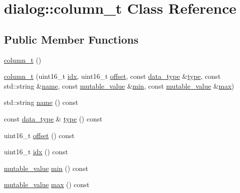 \hypertarget{classdialog_1_1column__t}{}\section{dialog\+:\+:column\+\_\+t Class Reference}
\label{classdialog_1_1column__t}
\subsection*{Public Member Functions}
\begin{DoxyCompactItemize}
\item 
\hyperlink{classdialog_1_1column__t_a294bc42fee87fb4e55542bda71a98843}{column\+\_\+t} ()
\item 
\hyperlink{classdialog_1_1column__t_a90d375f7d115c8241453867ebaf36b89}{column\+\_\+t} (uint16\+\_\+t \hyperlink{classdialog_1_1column__t_aca785728bbaaced685cd2e0d6a027173}{idx}, uint16\+\_\+t \hyperlink{classdialog_1_1column__t_a3889fc0e609ebba20c9b323a194cade1}{offset}, const \hyperlink{structdialog_1_1data__type}{data\+\_\+type} \&\hyperlink{classdialog_1_1column__t_a8316411224f15b6f25c59471422ca167}{type}, const std\+::string \&\hyperlink{classdialog_1_1column__t_a2a5d9e2d2673082a96218bb3c5b335b2}{name}, const \hyperlink{classdialog_1_1mutable__value}{mutable\+\_\+value} \&\hyperlink{classdialog_1_1column__t_a2c391fd127a2cdfbb5304c618f81b0b7}{min}, const \hyperlink{classdialog_1_1mutable__value}{mutable\+\_\+value} \&\hyperlink{classdialog_1_1column__t_a1588992ac054925f217f41a0de488896}{max})
\item 
std\+::string \hyperlink{classdialog_1_1column__t_a2a5d9e2d2673082a96218bb3c5b335b2}{name} () const
\item 
const \hyperlink{structdialog_1_1data__type}{data\+\_\+type} \& \hyperlink{classdialog_1_1column__t_a8316411224f15b6f25c59471422ca167}{type} () const
\item 
uint16\+\_\+t \hyperlink{classdialog_1_1column__t_a3889fc0e609ebba20c9b323a194cade1}{offset} () const
\item 
uint16\+\_\+t \hyperlink{classdialog_1_1column__t_aca785728bbaaced685cd2e0d6a027173}{idx} () const
\item 
\hyperlink{classdialog_1_1mutable__value}{mutable\+\_\+value} \hyperlink{classdialog_1_1column__t_a2c391fd127a2cdfbb5304c618f81b0b7}{min} () const
\item 
\hyperlink{classdialog_1_1mutable__value}{mutable\+\_\+value} \hyperlink{classdialog_1_1column__t_a1588992ac054925f217f41a0de488896}{max} () const

\end{DoxyCompactItemize}
